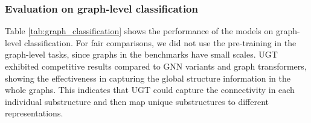 \documentclass[oneside]{article}
\begin{document}
\subsubsection{Evaluation on graph-level classification}

Table \ref{tab:graph_classification} shows the performance of the models on graph-level classification.
For fair comparisons, we did not use the pre-training in the graph-level tasks, since graphs in the benchmarks have small scales.
UGT exhibited competitive results compared to GNN variants and graph transformers, showing the effectiveness in capturing the global structure information in the whole graphs.
This indicates that UGT could capture the connectivity in each individual substructure and then map unique substructures to different representations. 
\end{document}
